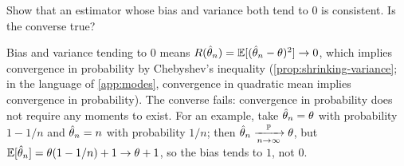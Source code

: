 \begin{exercise}
Show that an estimator whose bias and variance both tend to $0$ is consistent. Is the converse true?
\end{exercise}
\begin{solution}
Bias and variance tending to $0$ means $R(\hat{\theta}_n) = \operatorname*{\mathbb{E}}[(\hat{\theta}_n - \theta)^2] \to 0$, which implies convergence in probability by Chebyshev's inequality (\cref{prop:shrinking-variance}; in the language of \cref{app:modes}, convergence in quadratic mean implies convergence in probability). The converse fails: convergence in probability does not require any moments to exist. For an example, take $\hat{\theta}_n = \theta$ with probability $1 - 1/n$ and $\hat{\theta}_n = n$ with probability $1/n$; then $\hat{\theta}_n \xrightarrow [n \to \infty ]{\mathbb{P}} \theta$, but $\operatorname*{\mathbb{E}}[\hat{\theta}_n] = \theta(1 - 1/n) + 1 \to \theta + 1$, so the bias tends to $1$, not $0$.
\end{solution}
